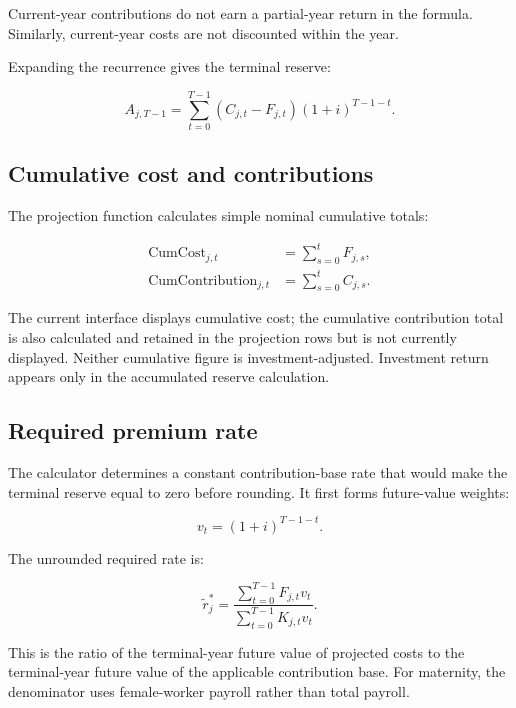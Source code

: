 Current-year contributions do not earn a partial-year return in the formula. Similarly, current-year costs are not discounted within the year.

Expanding the recurrence gives the terminal reserve:

\begin{equation}
A_{j,T-1}=\sum_{t=0}^{T-1}\left(C_{j,t}-F_{j,t}\right)(1+i)^{T-1-t}.
\end{equation}

\subsection{Cumulative cost and contributions}

The projection function calculates simple nominal cumulative totals:

\begin{align}
\operatorname{CumCost}_{j,t} &= \sum_{s=0}^{t}F_{j,s},\\
\operatorname{CumContribution}_{j,t} &= \sum_{s=0}^{t}C_{j,s}.
\end{align}

The current interface displays cumulative cost; the cumulative contribution total is also calculated and retained in the projection rows but is not currently displayed. Neither cumulative figure is investment-adjusted. Investment return appears only in the accumulated reserve calculation.

\subsection{Required premium rate}

The calculator determines a constant contribution-base rate that would make the terminal reserve equal to zero before rounding. It first forms future-value weights:

\begin{equation}
v_t=(1+i)^{T-1-t}.
\end{equation}

The unrounded required rate is:

\begin{equation}
\widetilde{r}_j^{\ast}=
\frac{\displaystyle\sum_{t=0}^{T-1}F_{j,t}v_t}
   {\displaystyle\sum_{t=0}^{T-1}K_{j,t}v_t}.
\end{equation}

This is the ratio of the terminal-year future value of projected costs to the terminal-year future value of the applicable contribution base. For maternity, the denominator uses female-worker payroll rather than total payroll.

